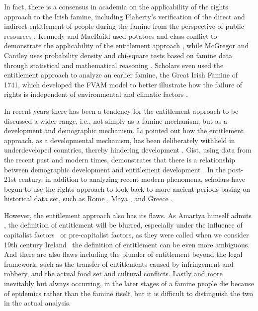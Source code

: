 In fact, there is a consensus in academia on the applicability of the rights approach to the Irish famine, including Flaherty's verification of the direct and indirect entitlement of  people during the famine from the perspective of public resources \citep{flaherty2021common}, Kennedy and MacRaild used potatoes and class conflict to demonstrate the applicability of the entitlement approach \citep{kennedy2022perspectives}, while McGregor and Cantley uses probability density and chi-square tests based on famine data through statistical and mathematical reasoning \citep{mcgregor1992test}. Scholars even used the entitlement approach to analyze an earlier famine, the Great Irish Famine of 1741, which developed the FVAM model to better illustrate how the failure of rights is independent of environmental and climatic factors \citep{engler2013irish}. 

In recent years there has been a tendency for the entitlement approach to be discussed a wider range, i.e., not simply as a famine mechanism, but as a development and demographic mechanism. Li pointed out how the entitlement approach, as a developmental mechanism, has been deliberately withheld in underdeveloped countries, thereby hindering development \citep{li2017after}. Gist, using data from the recent past and modern times, demonstrates that there is a relationship between demographic development and entitlement development \citep{gist2008population}. In the post-21st century, in addition to analyzing recent modern phenomena, scholars have begun to use the rights approach to look back to more ancient periods basing on historical data set, such as Rome \citep{jongman2006rise}, Maya \citep{barrett2004constructing}, and Greece \citep{gray2011exile}.

However, the entitlement approach also has its flaws. As Amartya himself admits \citep{sen1982poverty}, the definition of entitlement will be blurred, especially under the influence of capitalist factors \textendash\ or pre-capitalist factors, as they were called when we consider 19th century Ireland \textendash\ the definition of entitlement can be even more ambiguous. And there are also flaws including the plunder of entitlement beyond the legal framework, such as the transfer of entitlements caused by infringement and robbery, and the actual food set and cultural conflicts. Lastly and more inevitably but always occurring, in the later stages of a famine people die because of epidemics rather than the famine itself, but it is difficult to distinguish the two in the actual analysis.

